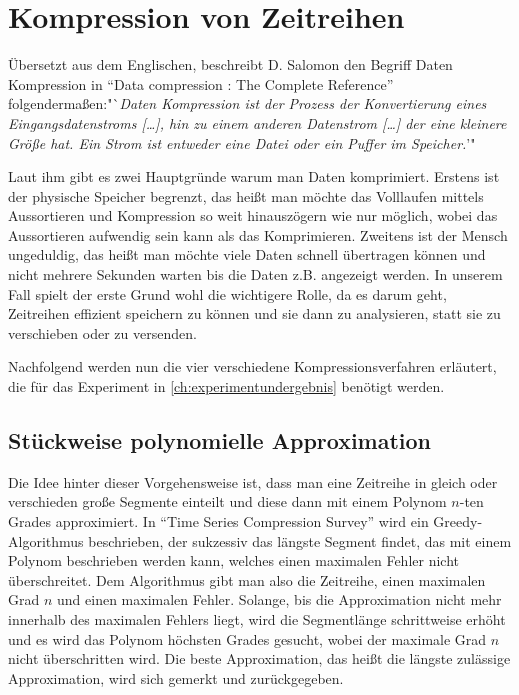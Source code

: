 \section{Kompression von Zeitreihen}
Übersetzt aus dem Englischen, beschreibt D. Salomon den Begriff Daten Kompression in "`Data compression : The Complete Reference"'\cite[p. 1-2]{d2004} folgendermaßen:"`\textit{Daten Kompression ist der Prozess der Konvertierung eines Eingangsdatenstroms [\ldots], hin zu einem anderen Datenstrom [\ldots] der eine kleinere Größe hat. Ein Strom ist entweder eine Datei oder ein Puffer im Speicher.}'"

Laut ihm gibt es zwei Hauptgründe warum man Daten komprimiert. Erstens ist der physische Speicher begrenzt, das heißt man möchte das Volllaufen mittels Aussortieren und Kompression so weit hinauszögern wie nur möglich, wobei das Aussortieren aufwendig sein kann als das Komprimieren. Zweitens ist der Mensch ungeduldig, das heißt man möchte viele Daten schnell übertragen können und nicht mehrere Sekunden warten bis die Daten z.B. angezeigt werden. In unserem Fall spielt der erste Grund wohl die wichtigere Rolle, da es darum geht, Zeitreihen effizient speichern zu können und sie dann zu analysieren, statt sie zu verschieben oder zu versenden.

Nachfolgend werden nun die vier verschiedene Kompressionsverfahren erläutert, die für das Experiment in \autoref{ch:experimentundergebnis} benötigt werden.

\subsection{Stückweise polynomielle Approximation}\label{subsec:ppa}
Die Idee hinter dieser Vorgehensweise ist, dass man eine Zeitreihe in gleich oder verschieden große Segmente einteilt und diese dann mit einem Polynom $n$-ten Grades approximiert. In "`Time Series Compression Survey"' \cite[Ch. 4.2.1]{gc2023} wird ein Greedy-Algorithmus beschrieben, der sukzessiv das längste Segment findet, das mit einem Polynom beschrieben werden kann, welches einen maximalen Fehler nicht überschreitet. Dem Algorithmus gibt man also die Zeitreihe, einen maximalen Grad $n$ und einen maximalen Fehler. Solange, bis die Approximation nicht mehr innerhalb des maximalen Fehlers liegt, wird die Segmentlänge schrittweise erhöht und es wird das Polynom höchsten Grades gesucht, wobei der maximale Grad $n$ nicht überschritten wird. Die beste Approximation, das heißt die längste zulässige Approximation, wird sich gemerkt und zurückgegeben.

